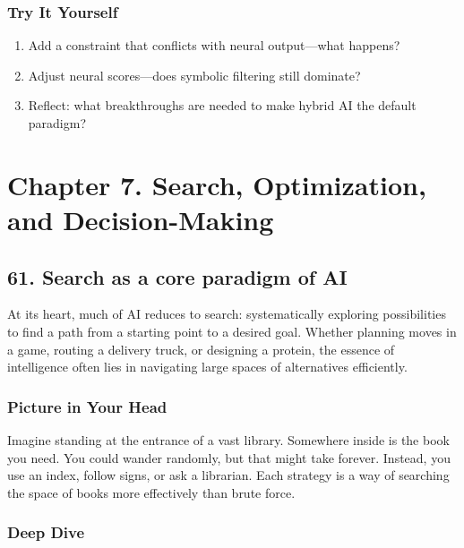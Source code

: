 \documentclass[
  letterpaper,
  DIV=11,
  numbers=noendperiod]{scrreprt}
\providecommand{\tightlist}{%
  \setlength{\itemsep}{0pt}\setlength{\parskip}{0pt}}
\begin{document}
\subsubsection{Try It Yourself}\label{try-it-yourself-59}

\begin{enumerate}
\def\labelenumi{\arabic{enumi}.}
\tightlist
\item
  Add a constraint that conflicts with neural output---what happens?
\item
  Adjust neural scores---does symbolic filtering still dominate?
\item
  Reflect: what breakthroughs are needed to make hybrid AI the default
  paradigm?
\end{enumerate}

\section{Chapter 7. Search, Optimization, and
Decision-Making}\label{chapter-7.-search-optimization-and-decision-making}

\subsection{61. Search as a core paradigm of
AI}\label{search-as-a-core-paradigm-of-ai}

At its heart, much of AI reduces to search: systematically exploring
possibilities to find a path from a starting point to a desired goal.
Whether planning moves in a game, routing a delivery truck, or designing
a protein, the essence of intelligence often lies in navigating large
spaces of alternatives efficiently.

\subsubsection{Picture in Your Head}\label{picture-in-your-head-60}

Imagine standing at the entrance of a vast library. Somewhere inside is
the book you need. You could wander randomly, but that might take
forever. Instead, you use an index, follow signs, or ask a librarian.
Each strategy is a way of searching the space of books more effectively
than brute force.

\subsubsection{Deep Dive}\label{deep-dive-60}
\end{document}
